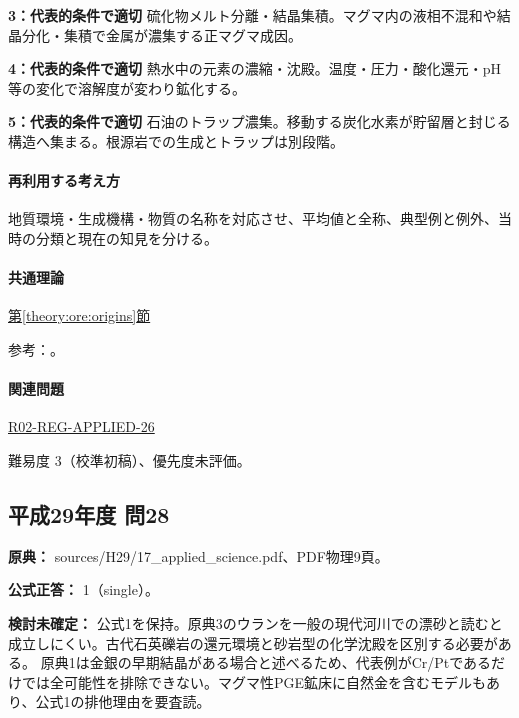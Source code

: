 \noindent\textbf{3：代表的条件で適切} 硫化物メルト分離・結晶集積。マグマ内の液相不混和や結晶分化・集積で金属が濃集する正マグマ成因。\par

\noindent\textbf{4：代表的条件で適切} 熱水中の元素の濃縮・沈殿。温度・圧力・酸化還元・pH等の変化で溶解度が変わり鉱化する。\par

\noindent\textbf{5：代表的条件で適切} 石油のトラップ濃集。移動する炭化水素が貯留層と封じる構造へ集まる。根源岩での生成とトラップは別段階。\par

\paragraph{再利用する考え方} 地質環境・生成機構・物質の名称を対応させ、平均値と全称、典型例と例外、当時の分類と現在の知見を分ける。

\paragraph{共通理論} \hyperref[theory:ore:origins]{第\ref*{theory:ore:origins}節}

\par 参考：\cite{ore50_bauxite_ref,ore50_porphyry_ref,ore50_magmatic_ref,ore50_besshi_ref}。

\paragraph{関連問題} \hyperref[q:r02-reg-applied-26]{R02-REG-APPLIED-26}

\par 難易度 3（校準初稿）、優先度未評価。

\subsection{平成29年度 問28}
\label{q:h29-reg-applied-28}

\noindent\textbf{原典：} sources/H29/17\_applied\_science.pdf、PDF物理9頁。

\textbf{公式正答：} 1（single）。

\par\textbf{検討未確定：} 公式1を保持。原典3のウランを一般の現代河川での漂砂と読むと成立しにくい。古代石英礫岩の還元環境と砂岩型の化学沈殿を区別する必要がある。 原典1は金銀の早期結晶がある場合と述べるため、代表例がCr/Ptであるだけでは全可能性を排除できない。マグマ性PGE鉱床に自然金を含むモデルもあり、公式1の排他理由を要査読。

